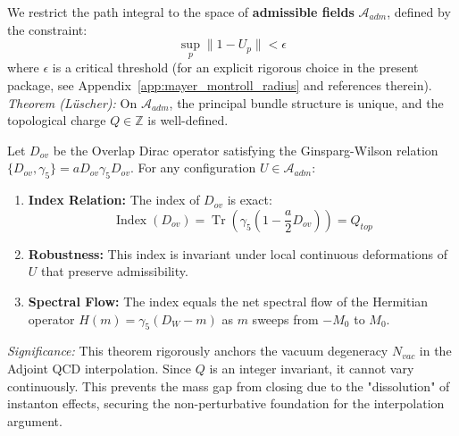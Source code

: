 \begin{definition}
We restrict the path integral to the space of \textbf{admissible fields} $\mathcal{A}_{adm}$, defined by the constraint:
\begin{equation}
\sup_p \| 1 - U_p \| < \epsilon
\end{equation}
where $\epsilon$ is a critical threshold (for an explicit rigorous choice in the present package, see Appendix~\ref{app:mayer_montroll_radius} and references therein).
\textit{Theorem (Lüscher)\cite{luescher1981topology}:} On $\mathcal{A}_{adm}$, the principal bundle structure is unique, and the topological charge $Q \in \mathbb{Z}$ is well-defined.
\end{definition}

\begin{theorem}
Let $D_{ov}$ be the Overlap Dirac operator satisfying the Ginsparg-Wilson relation $\{D_{ov}, \gamma_5\} = a D_{ov} \gamma_5 D_{ov}$. For any configuration $U \in \mathcal{A}_{adm}$:

\begin{enumerate}
    \item \textbf{Index Relation:} The index of $D_{ov}$ is exact:
    \begin{equation}
    \operatorname{Index}(D_{ov}) = \operatorname{Tr}(\gamma_5 (1 - \frac{a}{2} D_{ov})) = Q_{top}
    \end{equation}
    \item \textbf{Robustness:} This index is invariant under local continuous deformations of $U$ that preserve admissibility.
    \item \textbf{Spectral Flow:} The index equals the net spectral flow of the Hermitian operator $H(m) = \gamma_5(D_W - m)$ as $m$ sweeps from $-M_0$ to $M_0$.
\end{enumerate}

\textit{Significance:} This theorem rigorously anchors the vacuum degeneracy $N_{vac}$ in the Adjoint QCD interpolation. Since $Q$ is an integer invariant, it cannot vary continuously. This prevents the mass gap from closing due to the "dissolution" of instanton effects, securing the non-perturbative foundation for the interpolation argument.
\end{theorem}

